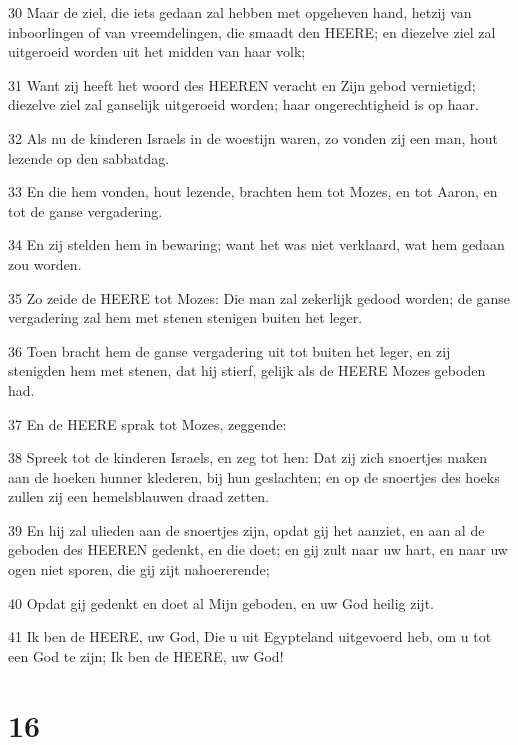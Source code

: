 \par 30 Maar de ziel, die iets gedaan zal hebben met opgeheven hand, hetzij van inboorlingen of van vreemdelingen, die smaadt den HEERE; en diezelve ziel zal uitgeroeid worden uit het midden van haar volk;
\par 31 Want zij heeft het woord des HEEREN veracht en Zijn gebod vernietigd; diezelve ziel zal ganselijk uitgeroeid worden; haar ongerechtigheid is op haar.
\par 32 Als nu de kinderen Israels in de woestijn waren, zo vonden zij een man, hout lezende op den sabbatdag.
\par 33 En die hem vonden, hout lezende, brachten hem tot Mozes, en tot Aaron, en tot de ganse vergadering.
\par 34 En zij stelden hem in bewaring; want het was niet verklaard, wat hem gedaan zou worden.
\par 35 Zo zeide de HEERE tot Mozes: Die man zal zekerlijk gedood worden; de ganse vergadering zal hem met stenen stenigen buiten het leger.
\par 36 Toen bracht hem de ganse vergadering uit tot buiten het leger, en zij stenigden hem met stenen, dat hij stierf, gelijk als de HEERE Mozes geboden had.
\par 37 En de HEERE sprak tot Mozes, zeggende:
\par 38 Spreek tot de kinderen Israels, en zeg tot hen: Dat zij zich snoertjes maken aan de hoeken hunner klederen, bij hun geslachten; en op de snoertjes des hoeks zullen zij een hemelsblauwen draad zetten.
\par 39 En hij zal ulieden aan de snoertjes zijn, opdat gij het aanziet, en aan al de geboden des HEEREN gedenkt, en die doet; en gij zult naar uw hart, en naar uw ogen niet sporen, die gij zijt nahoererende;
\par 40 Opdat gij gedenkt en doet al Mijn geboden, en uw God heilig zijt.
\par 41 Ik ben de HEERE, uw God, Die u uit Egypteland uitgevoerd heb, om u tot een God te zijn; Ik ben de HEERE, uw God!

\chapter{16}

